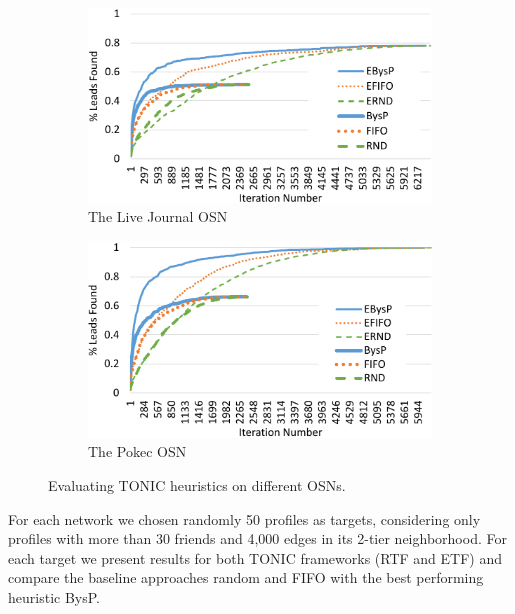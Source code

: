 \documentclass[prodmode,acmtecs]{acmsmall} %
\begin{document}
\begin{figure}
\centering
\begin{subfigure}{.5\textwidth}
  \centering
\includegraphics[width=\linewidth]{LiveJournal_cropped}
\caption{The Live Journal OSN}
\label{fig:live-journal}
\end{subfigure}%
\begin{subfigure}{.5\textwidth}
  \centering
\includegraphics[width=\linewidth]{Pokec_cropped}
\caption{The Pokec OSN}
\label{fig:pokec}
\end{subfigure}
\caption{Evaluating TONIC heuristics on different OSNs.}
\label{fig:extra-osns}
\end{figure}

For each network we chosen randomly 50 profiles as targets, considering only profiles with more than 30 friends and 4,000 edges in its 2-tier neighborhood. For each target we present results for both TONIC frameworks (RTF and ETF)
and compare the baseline approaches random and FIFO with the best performing heuristic BysP. 
\end{document}
